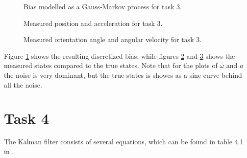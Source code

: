 \documentclass{article}
\begin{document}
\begin{figure}[!ht]
    \centering
    \caption{Bias modelled as a Gauss-Markov process for task 3.}
    \label{fig:disc_bias}
\end{figure}

\begin{figure}[!ht]
    \centering
    \caption{Measured position and acceleration for task 3.}
	\label{fig:pos_acc_task3}
\end{figure}

\begin{figure}[!ht]
    \centering
    \caption{Measured orientation angle and angular velocity for task 3.}
	\label{fig:ori_ang_task3}
\end{figure}

Figure \ref{fig:disc_bias} shows the resulting discretized bias, while figures \ref{fig:pos_acc_task3} and \ref{fig:ori_ang_task3} shows the measured states compared to the true states. Note that for the plots of $\omega$ and $a$ the noise is very dominant, but the true states is showes as a sine curve behind all the noise.

\section*{Task 4}
The Kalman filter consists of several equations, which can be found in table 4.1 in \cite{heftet}.
\end{document}
